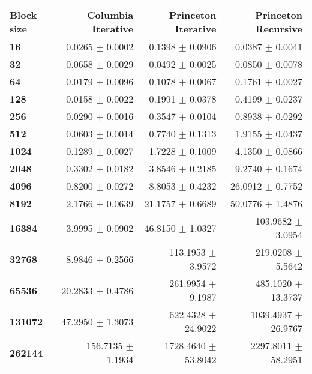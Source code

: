 \begin{tabular}{lrrr}\toprule
\textbf{Block size}  & \textbf{Columbia Iterative} & \textbf{Princeton Iterative} & \textbf{Princeton Recursive}\\\midrule
\textbf{16}  & 0.0265 $\pm$ 0.0002 & 0.1398 $\pm$ 0.0906 & 0.0387 $\pm$ 0.0041\\
\textbf{32}  & 0.0658 $\pm$ 0.0029 & 0.0492 $\pm$ 0.0025 & 0.0850 $\pm$ 0.0078\\
\textbf{64}  & 0.0179 $\pm$ 0.0096 & 0.1078 $\pm$ 0.0067 & 0.1761 $\pm$ 0.0027\\
\textbf{128}  & 0.0158 $\pm$ 0.0022 & 0.1991 $\pm$ 0.0378 & 0.4199 $\pm$ 0.0237\\
\textbf{256}  & 0.0290 $\pm$ 0.0016 & 0.3547 $\pm$ 0.0104 & 0.8938 $\pm$ 0.0292\\
\textbf{512}  & 0.0603 $\pm$ 0.0014 & 0.7740 $\pm$ 0.1313 & 1.9155 $\pm$ 0.0437\\
\textbf{1024}  & 0.1289 $\pm$ 0.0027 & 1.7228 $\pm$ 0.1009 & 4.1350 $\pm$ 0.0866\\
\textbf{2048}  & 0.3302 $\pm$ 0.0182 & 3.8546 $\pm$ 0.2185 & 9.2740 $\pm$ 0.1674\\
\textbf{4096}  & 0.8200 $\pm$ 0.0272 & 8.8053 $\pm$ 0.4232 & 26.0912 $\pm$ 0.7752\\
\textbf{8192}  & 2.1766 $\pm$ 0.0639 & 21.1757 $\pm$ 0.6689 & 50.0776 $\pm$ 1.4876\\
\textbf{16384}  & 3.9995 $\pm$ 0.0902 & 46.8150 $\pm$ 1.0327 & 103.9682 $\pm$ 3.0954\\
\textbf{32768}  & 8.9846 $\pm$ 0.2566 & 113.1953 $\pm$ 3.9572 & 219.0208 $\pm$ 5.5642\\
\textbf{65536}  & 20.2833 $\pm$ 0.4786 & 261.9954 $\pm$ 9.1987 & 485.1020 $\pm$ 13.3737\\
\textbf{131072}  & 47.2950 $\pm$ 1.3073 & 622.4328 $\pm$ 24.9022 & 1039.4937 $\pm$ 26.9767\\
\textbf{262144} & 156.7135 $\pm$ 1.1934 & 1728.4640 $\pm$ 53.8042 & 2297.8011 $\pm$ 58.2951\\
\bottomrule
\end{tabular}
